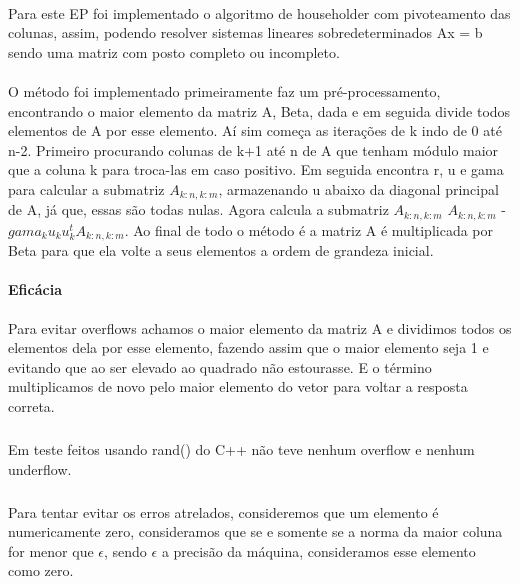 \documentclass{article}
\begin{document}
	\newcommand{\norma}[2]{\ ||
		\hspace{.05in}#1\hspace{.0in}\ ||
		{#2}}
	\paragraph{}Para este EP foi implementado o algoritmo de householder com pivoteamento das colunas, assim, podendo resolver sistemas lineares sobredeterminados Ax = b sendo uma matriz com posto completo ou incompleto.
	\paragraph{}O método foi implementado primeiramente faz um pré-processamento, encontrando o maior elemento da matriz A, Beta, dada e em seguida divide todos elementos de A por esse elemento. Aí sim começa as iterações de k indo de 0 até n-2. Primeiro procurando colunas de k+1 até n de A que tenham módulo maior que a coluna k para troca-las em caso positivo. Em seguida encontra r, u e gama para calcular a submatriz $A_{k:n,k:m}$, armazenando u abaixo da diagonal principal de A, já que, essas são todas nulas. Agora calcula a submatriz $A_{k:n,k:m}$ $A_{k:n,k:m}$ - $gama_{k}u_{k}u_{k}^{t}$$A_{k:n,k:m}$. Ao final de todo o método é a matriz A é multiplicada por Beta para que ela volte a seus elementos a ordem de grandeza inicial.
	\paragraph{Eficácia} Para evitar overflows achamos o maior elemento da matriz A e dividimos todos os elementos dela por esse elemento, fazendo assim que o maior elemento seja 1 e evitando que ao ser elevado ao quadrado não estourasse. E o término multiplicamos de novo pelo maior elemento do vetor para voltar a resposta correta.
	\subparagraph{}Em teste feitos usando rand() do C++ não teve nenhum overflow e nenhum underflow.
	\subparagraph{}Para tentar evitar os erros atrelados, consideremos que um elemento é numericamente zero, consideramos que se e somente se a norma da maior coluna for menor que $\epsilon$, sendo $\epsilon$ a precisão da máquina, consideramos esse elemento como zero.
\end{document}
